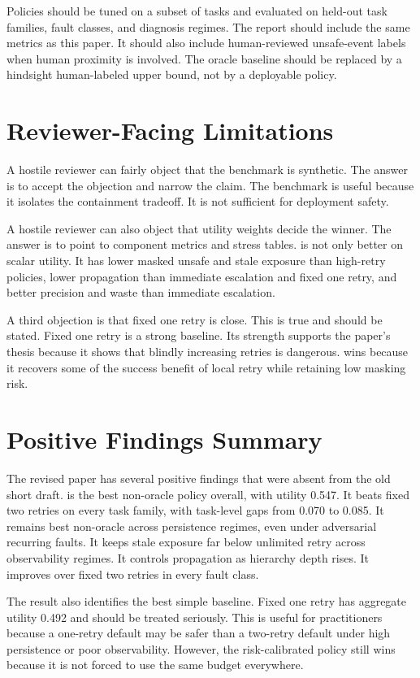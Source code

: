 Policies should be tuned on a subset of tasks and evaluated on held-out task families, fault classes, and diagnosis regimes. The report should include the same metrics as this paper. It should also include human-reviewed unsafe-event labels when human proximity is involved. The oracle baseline should be replaced by a hindsight human-labeled upper bound, not by a deployable policy.

\section{Reviewer-Facing Limitations}

A hostile reviewer can fairly object that the benchmark is synthetic. The answer is to accept the objection and narrow the claim. The benchmark is useful because it isolates the containment tradeoff. It is not sufficient for deployment safety.

A hostile reviewer can also object that utility weights decide the winner. The answer is to point to component metrics and stress tables. \method is not only better on scalar utility. It has lower masked unsafe and stale exposure than high-retry policies, lower propagation than immediate escalation and fixed one retry, and better precision and waste than immediate escalation.

A third objection is that fixed one retry is close. This is true and should be stated. Fixed one retry is a strong baseline. Its strength supports the paper's thesis because it shows that blindly increasing retries is dangerous. \method wins because it recovers some of the success benefit of local retry while retaining low masking risk.

\section{Positive Findings Summary}

The revised paper has several positive findings that were absent from the old short draft. \method is the best non-oracle policy overall, with utility 0.547. It beats fixed two retries on every task family, with task-level gaps from 0.070 to 0.085. It remains best non-oracle across persistence regimes, even under adversarial recurring faults. It keeps stale exposure far below unlimited retry across observability regimes. It controls propagation as hierarchy depth rises. It improves over fixed two retries in every fault class.

The result also identifies the best simple baseline. Fixed one retry has aggregate utility 0.492 and should be treated seriously. This is useful for practitioners because a one-retry default may be safer than a two-retry default under high persistence or poor observability. However, the risk-calibrated policy still wins because it is not forced to use the same budget everywhere.

